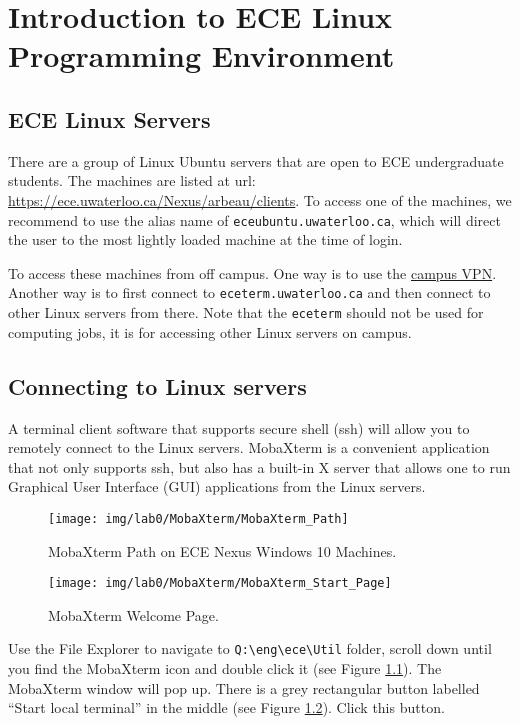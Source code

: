\chapter{Introduction to ECE Linux Programming Environment}
\label{ch_linux_env}

\section{ECE Linux Servers}

There are a group of Linux Ubuntu servers that are open to ECE undergraduate students. The machines are listed at url: \url{https://ece.uwaterloo.ca/Nexus/arbeau/clients}. To access one of the machines, we recommend to use the alias name of \verb+eceubuntu.uwaterloo.ca+, which will direct the user to the most lightly loaded machine at the time of login.

To access these machines from off campus. One way is to use the \href{https://uwaterloo.ca/information-systems-technology/services/virtual-private-network-vpn}{campus VPN}.
Another way is to first connect to \verb+eceterm.uwaterloo.ca+ and then connect to other Linux servers from there. Note that the \verb+eceterm+ should not be used for computing jobs, it is for accessing other Linux servers on campus.

\section{Connecting to Linux servers}

A terminal client software that supports secure shell (ssh) will allow you to remotely connect to the Linux servers. MobaXterm is a convenient application that not only supports ssh, but also has a built-in X server that allows one to run Graphical User Interface (GUI) applications from the Linux servers.
\begin{figure}[!htb]
  \centering
  \texttt{[image: img/lab0/MobaXterm/MobaXterm\_Path]}
  \caption{MobaXterm Path on ECE Nexus Windows 10 Machines.}
  \label{fig_MobaXterm_Path}
\end{figure}

\begin{figure}[!htb]
  \centering
  \texttt{[image: img/lab0/MobaXterm/MobaXterm\_Start\_Page]}
  \caption{MobaXterm Welcome Page.}
  \label{fig_MobaXterm_Start_Page}
\end{figure}

Use the File Explorer to navigate to \verb+Q:\eng\ece\Util+ folder, scroll down until you find the MobaXterm icon and double click it (see Figure \ref{fig_MobaXterm_Path}). The MobaXterm window will pop up. There is a grey rectangular button labelled ``Start local terminal'' in the middle (see Figure \ref{fig_MobaXterm_Start_Page}). Click this button.

